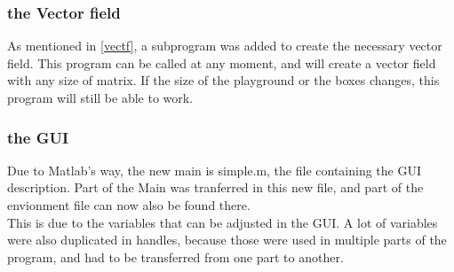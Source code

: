 \subsubsection{the Vector field}

As mentioned in \ref{vectf}, a subprogram was added to create the necessary vector field.
This program can be called at any moment, and will create a vector field with any size of matrix.
If the size of the playground or the boxes changes, this program will still be able to work.

\subsubsection{the GUI}

Due to Matlab's way, the new main is simple.m, the file containing the GUI description.
Part of the Main was tranferred in this new file, and part of the envionment file can now also be found there.\\

This is due to the variables that can be adjusted in the GUI.
A lot of variables were also duplicated in handles, because those were used in multiple parts of the program, and had to be transferred from one part to another.
